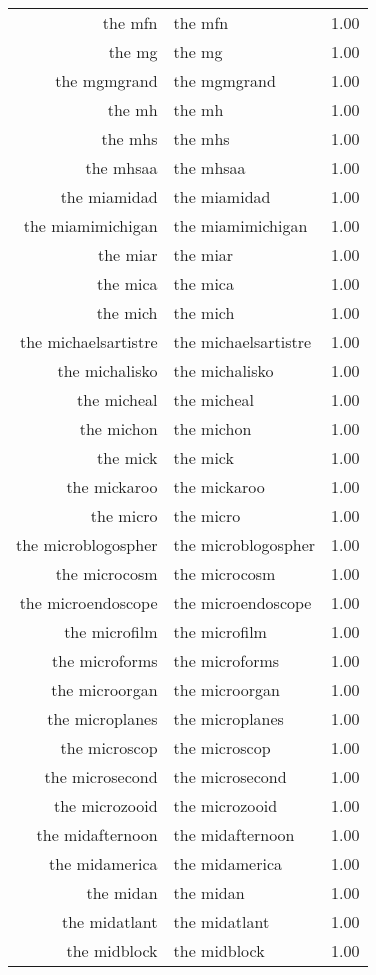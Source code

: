 \begin{table}[ht]
\begin{tabular}{rlr}
  the mfn & the mfn & 1.00 \\ 
  the mg & the mg & 1.00 \\ 
  the mgmgrand & the mgmgrand & 1.00 \\ 
  the mh & the mh & 1.00 \\ 
  the mhs & the mhs & 1.00 \\ 
  the mhsaa & the mhsaa & 1.00 \\ 
  the miamidad & the miamidad & 1.00 \\ 
  the miamimichigan & the miamimichigan & 1.00 \\ 
  the miar & the miar & 1.00 \\ 
  the mica & the mica & 1.00 \\ 
  the mich & the mich & 1.00 \\ 
  the michaelsartistre & the michaelsartistre & 1.00 \\ 
  the michalisko & the michalisko & 1.00 \\ 
  the micheal & the micheal & 1.00 \\ 
  the michon & the michon & 1.00 \\ 
  the mick & the mick & 1.00 \\ 
  the mickaroo & the mickaroo & 1.00 \\ 
  the micro & the micro & 1.00 \\ 
  the microblogospher & the microblogospher & 1.00 \\ 
  the microcosm & the microcosm & 1.00 \\ 
  the microendoscope & the microendoscope & 1.00 \\ 
  the microfilm & the microfilm & 1.00 \\ 
  the microforms & the microforms & 1.00 \\ 
  the microorgan & the microorgan & 1.00 \\ 
  the microplanes & the microplanes & 1.00 \\ 
  the microscop & the microscop & 1.00 \\ 
  the microsecond & the microsecond & 1.00 \\ 
  the microzooid & the microzooid & 1.00 \\ 
  the midafternoon & the midafternoon & 1.00 \\ 
  the midamerica & the midamerica & 1.00 \\ 
  the midan & the midan & 1.00 \\ 
  the midatlant & the midatlant & 1.00 \\ 
  the midblock & the midblock & 1.00 \\ 

\end{tabular}
\end{table}
